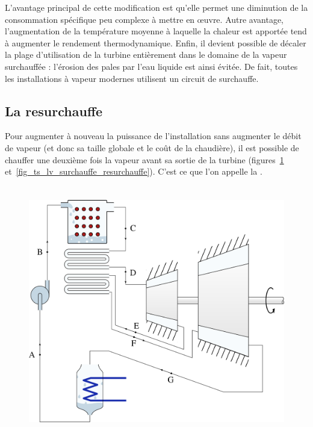 		L’avantage principal de cette modification est qu’elle permet une diminution de la consommation spécifique peu complexe à mettre en œuvre. Autre avantage, l’augmentation de la température moyenne à laquelle la chaleur est apportée tend à augmenter le rendement thermodynamique. Enfin, il devient possible de décaler la plage d’utilisation de la turbine entièrement dans le domaine de la vapeur surchauffée : l’érosion des pales par l’eau liquide est ainsi évitée. De fait, toutes les installations à vapeur modernes utilisent un circuit de surchauffe.


	\subsection{La resurchauffe}
	\label{ch_resurchauffe}

		Pour augmenter à nouveau la puissance de l’installation sans augmenter le débit de vapeur (et donc sa taille globale et le coût de la chaudière), il est possible de chauffer une deuxième fois la vapeur avant sa sortie de la turbine (figures~\ref{fig_cycle_resurchauffe} et~\ref{fig_ts_lv_surchauffe_resurchauffe}). C’est ce que l’on appelle la .

		\begin{figure}
			\begin{center}
				\includegraphics[height=11cm]{images/circuit_surchauffe_resurchauffe.png}
			\end{center}
			\label{fig_cycle_resurchauffe}
		\end{figure}

